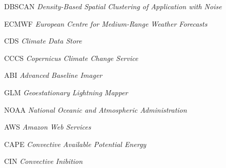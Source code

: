 \begin{siglas}
  \item[DBSCAN] \textit{Density-Based Spatial Clustering of Application with Noise}
  \item[ECMWF] \textit{European Centre for Medium-Range Weather Forecasts}
  \item[CDS] \textit{Climate Data Store}
  \item[CCCS] \textit{Copernicus Climate Change Service}
  \item[ABI] \textit{Advanced Baseline Imager}
  \item[GLM] \textit{Geoestationary Lightning Mapper}
  \item[NOAA] \textit{National Oceanic and Atmospheric Administration}
  \item[AWS] \textit{Amazon Web Services}
  \item[CAPE] \textit{Convective Available Potential Energy}
  \item[CIN] \textit{Convective Inibition}
\end{siglas}
